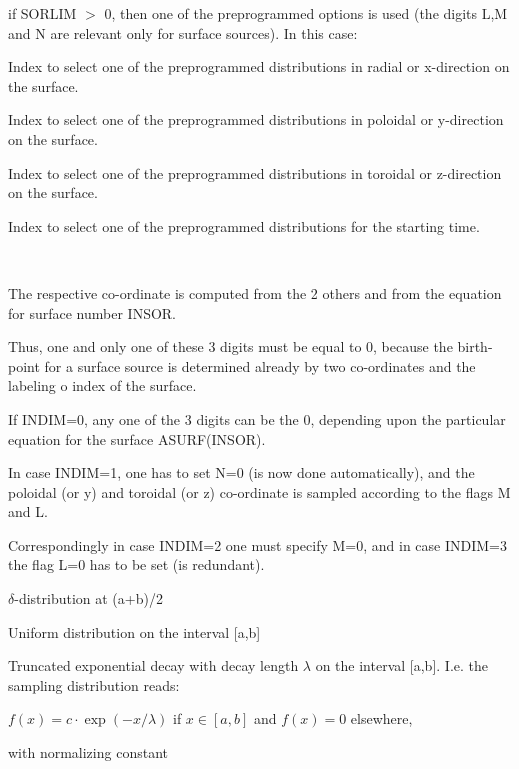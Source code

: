 \begin{list}{ }{}
if SORLIM $>$  0, then one of the preprogrammed options is used
(the digits L,M and N are relevant only for surface sources).
In this case:
\begin{list}{ }{}
\item[{N }]
Index to select one of the preprogrammed distributions
in radial or x-direction on the surface.
\item[{M }]
Index to select one of the preprogrammed distributions
in poloidal or y-direction on the surface.
\item[{L }]
Index to select one of the preprogrammed distributions
in toroidal or z-direction on the surface.
\item[{K }]
Index to select one of the preprogrammed distributions
for the starting time.
\item[{M,N,L = 0}] ~

The respective co-ordinate is computed from the 2 others and
from the equation for surface number INSOR.
\end{list}

Thus, one and only one of these 3 digits must be equal to 0,
because the
birth-point for a surface source
is determined already by two co-ordinates and the labeling                                                             o
index of the surface.

If INDIM=0, any one of the 3 digits can be the 0,
depending upon the particular equation for the surface ASURF(INSOR).

In case INDIM=1, one has to set N=0 (is now done automatically), and the poloidal (or y) and
toroidal (or z) co-ordinate is sampled according to the flags M and L.

Correspondingly in case  INDIM=2 one must
specify M=0, and  in case INDIM=3 the flag L=0 has to be set (is redundant).

\begin{list}{ }{}
\item[{L,M,N = 1 }]
$\delta$-distribution at (a+b)/2
\item[{L,M,N = 2 }]
Uniform distribution on the interval [a,b]
\item[{L,M,N = 3 }]
Truncated exponential decay
with decay length $\lambda$  on the interval [a,b].
I.e. the sampling distribution reads:

$f(x) = c  \cdot   \exp( - x/ \lambda)$ if $x \in [a,b]$ and $f(x) =
0$ elsewhere,

with normalizing constant


\end{list}
\end{list}
